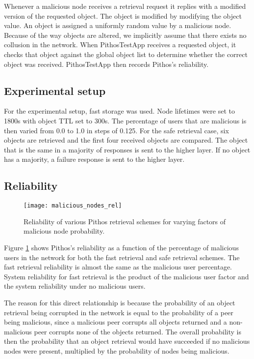 Whenever a malicious node receives a retrieval request it replies with a modified version of the requested object. The object is modified by modifying the object value. An object is assigned a uniformly random value by a malicious node. Because of the way objects are altered, we implicitly assume that there exists no collusion in the network. When PithosTestApp receives a requested object, it checks that object against the global object list to determine whether the correct object was received. PithosTestApp then records Pithos's reliability.

\subsection{Experimental setup}
For the experimental setup, fast storage was used. Node lifetimes were set to 1800s with object TTL set to 300s. The percentage of users that are malicious is then varied from 0.0 to 1.0 in steps of 0.125. For the safe retrieval case, six objects are retrieved and the first four received objects are compared. The object that is the same in a majority of responses is sent to the higher layer. If no object has a majority, a failure response is sent to the higher layer.

\subsection{Reliability}
\begin{figure}[htbp]
 \centering
 \texttt{[image: malicious\_nodes\_rel]}
 \caption{Reliability of various Pithos retrieval schemes for varying factors of malicious node probability.}
 \label{fig_malicious_nodes_rel}
\end{figure}
%
Figure \ref{fig_malicious_nodes_rel} shows Pithos's reliability as a function of the percentage of malicious users in the network for both the fast retrieval and safe retrieval schemes. The fast retrieval reliability is almost the same as the malicious user percentage. System reliability for fast retrieval is the product of the malicious user factor and the system reliability under no malicious users.

The reason for this direct relationship is because the probability of an object retrieval being corrupted in the network is equal to the probability of a peer being malicious, since a malicious peer corrupts all objects returned and a non-malicious peer corrupts none of the objects returned. The overall probability is then the probability that an object retrieval would have succeeded if no malicious nodes were present, multiplied by the probability of nodes being malicious.

